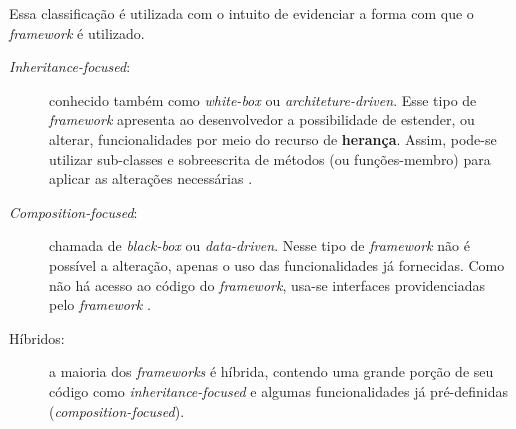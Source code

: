 Essa classificação é utilizada com o intuito de evidenciar a forma com que o \textit{framework} é utilizado.
\begin{description}
\item[\textit{Inheritance-focused}:] conhecido também como \textit{white-box} ou \textit{architeture-driven}. Esse tipo de \textit{framework} apresenta ao desenvolvedor a possibilidade de estender, ou alterar, funcionalidades por meio do recurso de \textbf{herança}. Assim, pode-se utilizar sub-classes e sobreescrita de métodos (ou funções-membro) para aplicar as alterações necessárias \cite{sauve2006}.
\item[\textit{Composition-focused}:] chamada de \textit{black-box} ou \textit{data-driven}. Nesse tipo de \textit{framework}  não é possível a alteração, apenas o uso das funcionalidades já fornecidas. Como não há acesso ao código do \textit{framework}, usa-se interfaces providenciadas pelo \textit{framework} \cite{sauve2006}.
\item[Híbridos:] a maioria dos \textit{frameworks} é híbrida, contendo uma grande porção de seu código como \textit{inheritance-focused} e algumas funcionalidades já pré-definidas (\textit{composition-focused}).
\end{description}


